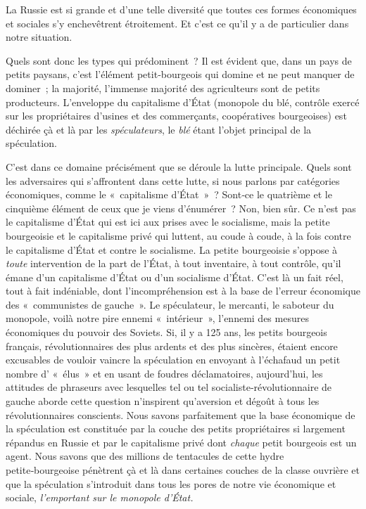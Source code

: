 \documentclass[french,twoside]{book} %
\begin{document}
\noindent La Russie est si grande et d’une telle diversité que toutes ces formes économiques et sociales s’y enchevêtrent étroitement. Et c’est ce qu’il y a de particulier dans no­tre situation.\par
Quels sont donc les types qui prédominent ? Il est évident que, dans un pays de petits paysans, c’est l’élément petit‑bourgeois qui domine et ne peut manquer de dominer ; la majorité, l’immense majorité des agriculteurs sont de petits producteurs. L'enveloppe du capitalisme d’État (monopole du blé, contrôle exercé sur les propriétaires d’usines et des commerçants, coopératives bourgeoises) est déchirée çà et là par les \emph{spéculateurs}, le \emph{blé} étant l’objet principal de la spéculation.\par
C'est dans ce domaine précisément que se déroule la lutte principale. Quels sont les adversaires qui s’affrontent dans cette lutte, si nous parlons par catégories économiques, comme le « capitalisme d’État » ? Sont‑ce le quatrième et le cinquième élément de ceux que je viens d’énumérer ? Non, bien sûr. Ce n’est pas le capitalisme d’État qui est ici aux prises avec le socialisme, mais la petite bourgeoisie et le capitalisme privé qui luttent, au coude à coude, à la fois contre le capitalisme d’État et contre le socialisme. La petite bourgeoisie s’oppose à \emph{toute} intervention de la part de l’État, à tout inventaire, à tout contrôle, qu’il émane d’un capitalisme d’État ou d’un socialisme d’État. C’est là un fait réel, tout à fait indéniable, dont l’incompréhension est à la base de l’erreur économique des « communistes de gauche ». Le spéculateur, le mercanti, le saboteur du monopole, voilà notre pire ennemi « intérieur », l’ennemi des mesures économiques du pouvoir des Soviets. Si, il y a 125 ans, les petits bourgeois français, révolutionnaires des plus ardents et des plus sincères, étaient encore excusables de vouloir vaincre la spéculation en envoyant à l’échafaud un petit nombre d’ « élus » et en usant de foudres déclamatoires, aujourd’hui, les attitudes de phraseurs avec lesquelles tel ou tel socialiste‑révolutionnaire de gauche aborde cette question n’inspirent qu’aversion et dégoût à tous les révolutionnaires conscients. Nous savons parfaitement que la base économique de la spéculation est constituée par la couche des petits propriétaires si largement répandus en Russie et par le capitalisme privé dont \emph{chaque} petit bourgeois est un agent. Nous savons que des millions de tentacules de cette hydre petite‑bourgeoise pénètrent çà et là dans certaines couches de la classe ouvrière et que la spéculation s’introduit dans tous les pores de notre vie économique et sociale, \emph{l’emportant sur le monopole d’État.}\par
\end{document}
